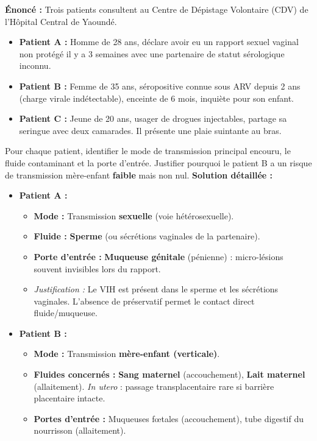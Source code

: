 \documentclass[11pt]{article}
\begin{document}
\begin{exoresolu}
\textbf{Énoncé :} Trois patients consultent au Centre de Dépistage Volontaire (CDV) de l'Hôpital Central de Yaoundé.
\begin{itemize}
    \item \textbf{Patient A :} Homme de 28 ans, déclare avoir eu un rapport sexuel vaginal non protégé il y a 3 semaines avec une partenaire de statut sérologique inconnu.
    \item \textbf{Patient B :} Femme de 35 ans, séropositive connue sous ARV depuis 2 ans (charge virale indétectable), enceinte de 6 mois, inquiète pour son enfant.
    \item \textbf{Patient C :} Jeune de 20 ans, usager de drogues injectables, partage sa seringue avec deux camarades. Il présente une plaie suintante au bras.
\end{itemize}
Pour chaque patient, identifier le mode de transmission principal encouru, le fluide contaminant et la porte d'entrée. Justifier pourquoi le patient B a un risque de transmission mère-enfant \textbf{faible} mais non nul.
\tcblower
\textbf{Solution détaillée :}
\begin{itemize}
    \item \textbf{Patient A :}
    \begin{itemize}
        \item \textbf{Mode :} Transmission \textbf{sexuelle} (voie hétérosexuelle).
        \item \textbf{Fluide :} \textbf{Sperme} (ou sécrétions vaginales de la partenaire).
        \item \textbf{Porte d'entrée :} \textbf{Muqueuse génitale} (pénienne) : micro-lésions souvent invisibles lors du rapport.
        \item \textit{Justification :} Le VIH est présent dans le sperme et les sécrétions vaginales. L'absence de préservatif permet le contact direct fluide/muqueuse.
    \end{itemize}
    \item \textbf{Patient B :}
    \begin{itemize}
        \item \textbf{Mode :} Transmission \textbf{mère-enfant (verticale)}.
        \item \textbf{Fluides concernés :} \textbf{Sang maternel} (accouchement), \textbf{Lait maternel} (allaitement). \emph{In utero} : passage transplacentaire rare si barrière placentaire intacte.
        \item \textbf{Portes d'entrée :} Muqueuses fœtales (accouchement), tube digestif du nourrisson (allaitement).

\end{itemize}
\end{itemize}
\end{exoresolu}
\end{document}
